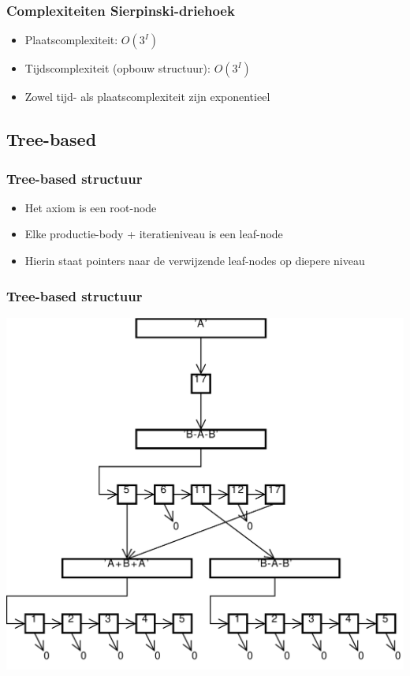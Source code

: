 \documentclass[ignorenonframetext,compress]{beamer}
\begin{document}
\begin{frame}[fragile]
	\frametitle{Complexiteiten Sierpinski-driehoek}
\begin{itemize}
\item Plaatscomplexiteit: $O(3^I)$
\item Tijdscomplexiteit (opbouw structuur): $O(3^I)$
\item Zowel tijd- als plaatscomplexiteit zijn exponentieel
\end{itemize}
\end{frame}

\subsection{Tree-based}

\begin{frame}[fragile]
	\frametitle{Tree-based structuur}
\begin{itemize}
\item Het axiom is een root-node
\item Elke productie-body + iteratieniveau is een leaf-node
\item Hierin staat pointers naar de verwijzende leaf-nodes op diepere niveau
\end{itemize}
\end{frame}

\begin{frame}[fragile]
	\frametitle{Tree-based structuur}
\begin{center}
\includegraphics[height=0.9\textheight]{struct.pdf}
\end{center}
\end{frame}
\end{document}
